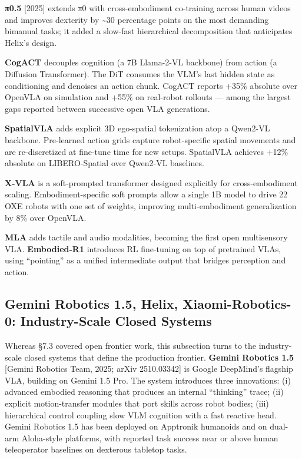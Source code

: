 \documentclass{article}
\begin{document}
\textbf{π0.5} {[}2025{]} extends π0 with cross-embodiment co-training across human videos and improves dexterity by \textasciitilde30 percentage points on the most demanding bimanual tasks; it added a slow-fast hierarchical decomposition that anticipates Helix's design.

\textbf{CogACT} \cite{li2024cogactafoundationa} decouples cognition (a 7B Llama-2-VL backbone) from action (a Diffusion Transformer). The DiT consumes the VLM's last hidden state as conditioning and denoises an action chunk. CogACT reports +35\% absolute over OpenVLA on simulation and +55\% on real-robot rollouts --- among the largest gaps reported between successive open VLA generations.

\textbf{SpatialVLA} \cite{qu2025spatialvlaexplorin} adds explicit 3D ego-spatial tokenization atop a Qwen2-VL backbone. Pre-learned action grids capture robot-specific spatial movements and are re-discretized at fine-tune time for new setups. SpatialVLA achieves +12\% absolute on LIBERO-Spatial over Qwen2-VL baselines.

\textbf{X-VLA} \cite{zheng2025xvlasoftpromptedtr} is a soft-prompted transformer designed explicitly for cross-embodiment scaling. Embodiment-specific soft prompts allow a single 1B model to drive 22 OXE robots with one set of weights, improving multi-embodiment generalization by 8\% over OpenVLA.

\textbf{MLA} \cite{liu2025mlaamultisensoryla} adds tactile and audio modalities, becoming the first open multisensory VLA. \textbf{Embodied-R1} \cite{yuan2025embodiedr1reinforc} introduces RL fine-tuning on top of pretrained VLAs, using ``pointing'' as a unified intermediate output that bridges perception and action.

\subsection{Gemini Robotics 1.5, Helix, Xiaomi-Robotics-0: Industry-Scale Closed Systems}\label{gemini-robotics-1.5-helix-xiaomi-robotics-0-industry-scale-closed-systems}

Whereas §7.3 covered open frontier work, this subsection turns to the industry-scale closed systems that define the production frontier. \textbf{Gemini Robotics 1.5} {[}Gemini Robotics Team, 2025; arXiv 2510.03342{]} is Google DeepMind's flagship VLA, building on Gemini 1.5 Pro. The system introduces three innovations: (i) advanced embodied reasoning that produces an internal ``thinking'' trace; (ii) explicit motion-transfer modules that port skills across robot bodies; (iii) hierarchical control coupling slow VLM cognition with a fast reactive head. Gemini Robotics 1.5 has been deployed on Apptronik humanoids and on dual-arm Aloha-style platforms, with reported task success near or above human teleoperator baselines on dexterous tabletop tasks.
\end{document}
